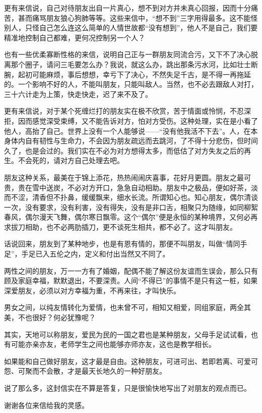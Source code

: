 \par 更有来信说，自己对待朋友出自一片真心，想不到对方并未真心回报，因而十分痛苦，甚而痛骂朋友狼心狗肺等等。这些来信中，“想不到”三字用得最多。这不能怪别人，只怪自己怎么连这么简单的人情世故都“没有想到”，他人不是自己，我们要精准地控制自己都难，更何况控制另一个人？
\par 也有一些优柔寡断性格的来信，说明自己正与一群朋友同流合污，又下不了决心脱离那个圈子，请问三毛要怎么办？我说，就这么办，跳出那条污水河，比如壮士断腕，起初可能麻烦，事后想想，幸亏下了决心，不然失足千古，是不得一再拖延的。一个影响不好的人，不能叫朋友，只能叫敌人。当然，也不必去跟敌人对打，三十六计走为上策，快走快走，迟了来不及了。
\par 更有来信说，对于某个死缠烂打的朋友实在极不欣赏，苦于情面或怜悯，不忍深拒，因而感觉深受束缚，又不能告诉对方，怕对方受伤。这种处理，实在是小看了他人，高抬了自己。世界上没有一个人能够说——“没有他我活不下去”。人，在本身体内自有韧性与生命力，不会因为朋友疏远而去跳河，了不得十分悲伤，但时间久了，也是会过的。我们实在不必为对方想得太多，而低估了对方失友之后的再生。不会死的，请对方自己处理去吧。
\par 朋友这种关系，最美在于锦上添花，热热闹闹庆喜事，花好月更圆。朋友之最可贵，贵在雪中送炭，不必对方开口，急急自动相助。朋友中之极品，便如好茶，淡而不涩，清香但不扑鼻，缓缓飘来，细水长流。所谓知心也。知心朋友，偶尔清谈一次，没有要求，没有利害，没有得失，没有是非口舌，相聚只为随缘，如同柳絮春风，偶尔漫天飞舞，偶尔寒日飘零。这个“偶尔”便是永恒的某种境界，又何必再求拔刀相助，也不必两肋插刀，更不谈死生相共，都不必了。这才叫朋友。
\par 话说回来，朋友到了某种地步，也是有恩有情的，那便不叫朋友，叫做“情同手足”，手足已入五伦之内，定义和付出当然又不同了。
\par 两性之间的朋友，万一一方有了婚姻，配偶不能了解这份友谊而生误会，那么只有顾及家庭幸福，默默退出，不要深责。人间“不得已”的事情不是只有这一桩，如果深爱朋友，必须以对方幸福为重，不再来往，才叫快乐。
\par 男女之间，以纯友情转化为爱情，也未曾不可，相知又相爱，同组家庭，两全其美，不也很好？何必犹豫呢？
\par 其实，天地可以称朋友，爱民为民的一国之君也是某种朋友，父母手足试试看，也有可能亦亲亦友，老师学生之间也能够亦师亦友，这也是教学相长。
\par 如果能和自己做好朋友，这才最是自由。这种朋友，可进可出、若即若离、可爱可怨、可聚而不会散，才是最天长地久的一种好朋友。
\par 说了那么多，这封信实在不算是答复，只是很愉快地写出了对朋友的观点而已。
\par 谢谢各位来信给我的灵感。
\par {}


